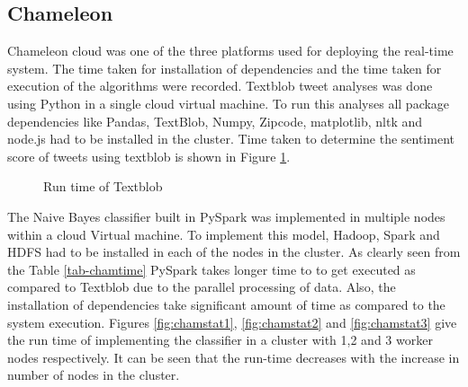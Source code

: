 \documentclass[9pt,twocolumn,twoside]{styles/osajnl}
\begin{document}
\subsection{Chameleon}
Chameleon cloud was one of the three platforms used for deploying the real-time system. The time taken for installation of dependencies and the time taken for execution of the algorithms were recorded. Textblob tweet analyses was done using Python in a single cloud virtual machine. To run this analyses all package dependencies like Pandas, TextBlob, Numpy, Zipcode, matplotlib, nltk and node.js had to be installed in the cluster. Time taken to determine the sentiment score of tweets using textblob is shown in Figure \ref{fig:tbrun}.\\
\begin{figure}[htbp]
\centering
{}
\caption{Run time of Textblob}
\label{fig:tbrun}
\end{figure}
The Naive Bayes classifier built in PySpark was implemented in multiple nodes within a cloud Virtual machine. To implement this model, Hadoop, Spark and HDFS had to be installed in each of the nodes in the cluster. As clearly seen from the Table \ref{tab-chamtime} PySpark takes longer time to to get executed as compared to Textblob due to the parallel processing of data. Also, the installation of dependencies take significant amount of time as compared to the system execution. Figures \ref{fig:chamstat1}, \ref{fig:chamstat2} and \ref{fig:chamstat3} give the run time of implementing the classifier in a cluster with 1,2 and 3 worker nodes respectively. It can be seen that the run-time decreases with the increase in number of nodes in the cluster. 
\end{document}
